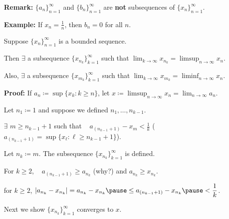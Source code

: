 \documentclass[10pt,aspectratio=149]{beamer}
\begin{document}
\begin{frame}

\textbf{Remark:} $\{ a_n \}_{n=1}^\infty$ and $\{b_n\}_{n=1}^\infty$ are
\textbf{not} subsequences of $\{x_n\}_{n=1}^\infty$.

\pause
\textbf{Example:} If $x_n = \frac{1}{n}$, then $b_n = 0$ for all $n$.

\pause
\begin{theorem}
Suppose $\{ x_n \}_{n=1}^\infty$ is a bounded sequence.

\pause
Then $\exists$ a subsequence $\{ x_{n_k} \}_{k=1}^\infty$ such that
\quad
$\displaystyle \lim_{k\to \infty} x_{n_k} = \limsup_{n \to \infty} x_n$.

\pause
Also, $\exists$ a subsequence
$\{ x_{m_k} \}_{k=1}^\infty$ such that
\quad
$\displaystyle
\lim_{k\to \infty} x_{m_k} = \liminf_{n \to \infty} x_n$.
\end{theorem}

\pause
\textbf{Proof:}
If $a_n \coloneqq \sup \{ x_k : k \geq n \}$,
let $\displaystyle x \coloneqq \limsup_{n\to\infty} x_n = \lim_{n\to\infty} a_n$.

\pause
Let $n_1 \coloneqq 1$ and suppose we defined $n_1,\ldots,n_{k-1}$.

\pause
$\exists$ $m \geq n_{k-1} + 1$ such that
~ $\displaystyle a_{(n_{k-1}+1)} - x_m < \frac{1}{k}$
\quad ($a_{(n_{k-1}+1)} = \sup \{ x_\ell : \ell \geq n_{k-1} + 1 \}$).

\pause
\medskip

Let $n_{k} \coloneqq m$.  The subsequence $\{ x_{n_k} \}_{k=1}^\infty$ is defined.

\pause
\medskip

For $k \geq 2$, ~ $a_{(n_{k-1}+1)} \geq a_{n_k}$ (why?) and $a_{n_{k}} \geq x_{n_k}$.

\pause
\thus \quad for $k \geq 2$,
\quad $\displaystyle \abs{a_{n_k} - x_{n_k}} =
a_{n_k} - x_{n_k}
\pause
\leq
a_{(n_{k-1}+1)} - x_{n_k}
\pause
< \frac{1}{k}$.

\pause
\medskip

Next we show $\{ x_{n_k} \}_{k=1}^\infty$ converges to $x$.

\end{frame}
\end{document}
